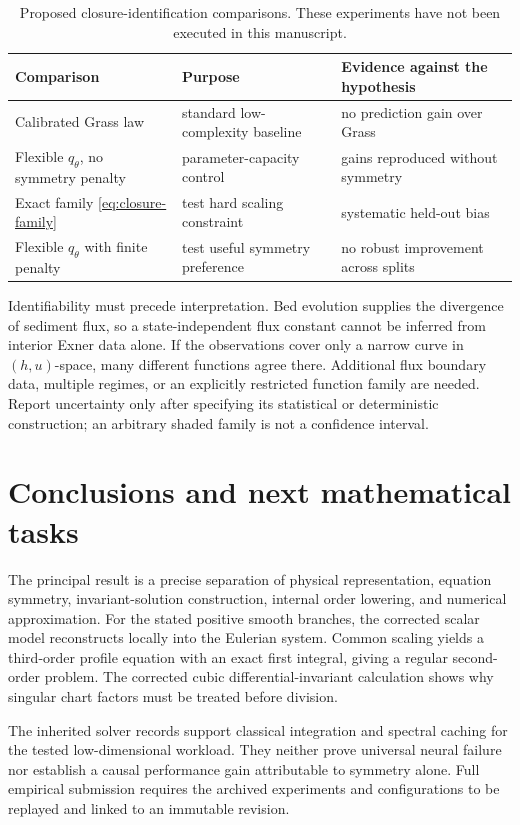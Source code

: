 \documentclass[11pt,a4paper,oneside]{report}
\numberwithin{equation}{chapter}
\begin{document}
\begin{table}[htbp]\centering\small
\begin{tabularx}{\textwidth}{@{}p{}XX@{}}\toprule
Comparison & Purpose & Evidence against the hypothesis\\\midrule
Calibrated Grass law & standard low-complexity baseline & no prediction gain over Grass\\
Flexible $q_\theta$, no symmetry penalty & parameter-capacity control & gains reproduced without symmetry\\
Exact family \eqref{eq:closure-family} & test hard scaling constraint & systematic held-out bias\\
Flexible $q_\theta$ with finite penalty & test useful symmetry preference & no robust improvement across splits\\\bottomrule
\end{tabularx}
\caption{Proposed closure-identification comparisons. These experiments have not been executed in this manuscript.}\label{tab:identification}
\end{table}
Identifiability must precede interpretation. Bed evolution supplies the divergence of sediment flux, so a state-independent flux constant cannot be inferred from interior Exner data alone. If the observations cover only a narrow curve in $(h,u)$-space, many different functions agree there. Additional flux boundary data, multiple regimes, or an explicitly restricted function family are needed. Report uncertainty only after specifying its statistical or deterministic construction; an arbitrary shaded family is not a confidence interval.

\section{Conclusions and next mathematical tasks}
The principal result is a precise separation of physical representation, equation symmetry, invariant-solution construction, internal order lowering, and numerical approximation. For the stated positive smooth branches, the corrected scalar model reconstructs locally into the Eulerian system. Common scaling yields a third-order profile equation with an exact first integral, giving a regular second-order problem. The corrected cubic differential-invariant calculation shows why singular chart factors must be treated before division.

The inherited solver records support classical integration and spectral caching for the tested low-dimensional workload. They neither prove universal neural failure nor establish a causal performance gain attributable to symmetry alone. Full empirical submission requires the archived experiments and configurations to be replayed and linked to an immutable revision.
\end{document}
